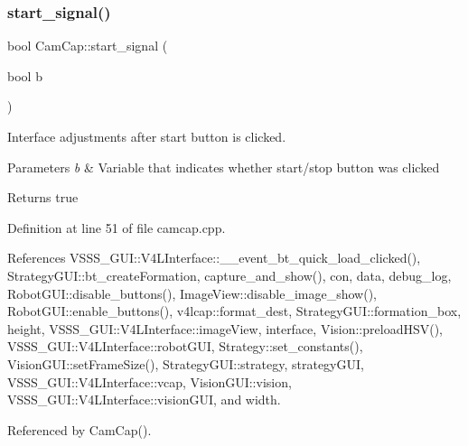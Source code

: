 \subsubsection{\texorpdfstring{start\+\_\+signal()}{start\_signal()}}
{\footnotesize\ttfamily bool Cam\+Cap\+::start\+\_\+signal (\begin{DoxyParamCaption}\item[{bool}]{b }\end{DoxyParamCaption})}



Interface adjustments after \textquotesingle{}start\textquotesingle{} button is clicked. 


\begin{DoxyParams}{Parameters}
{\em b} & Variable that indicates whether start/stop button was clicked \\
\hline
\end{DoxyParams}
\begin{DoxyReturn}{Returns}
true 
\end{DoxyReturn}


Definition at line 51 of file camcap.\+cpp.



References V\+S\+S\+S\+\_\+\+G\+U\+I\+::\+V4\+L\+Interface\+::\+\_\+\+\_\+event\+\_\+bt\+\_\+quick\+\_\+load\+\_\+clicked(), Strategy\+G\+U\+I\+::bt\+\_\+create\+Formation, capture\+\_\+and\+\_\+show(), con, data, debug\+\_\+log, Robot\+G\+U\+I\+::disable\+\_\+buttons(), Image\+View\+::disable\+\_\+image\+\_\+show(), Robot\+G\+U\+I\+::enable\+\_\+buttons(), v4lcap\+::format\+\_\+dest, Strategy\+G\+U\+I\+::formation\+\_\+box, height, V\+S\+S\+S\+\_\+\+G\+U\+I\+::\+V4\+L\+Interface\+::image\+View, interface, Vision\+::preload\+H\+S\+V(), V\+S\+S\+S\+\_\+\+G\+U\+I\+::\+V4\+L\+Interface\+::robot\+G\+UI, Strategy\+::set\+\_\+constants(), Vision\+G\+U\+I\+::set\+Frame\+Size(), Strategy\+G\+U\+I\+::strategy, strategy\+G\+UI, V\+S\+S\+S\+\_\+\+G\+U\+I\+::\+V4\+L\+Interface\+::vcap, Vision\+G\+U\+I\+::vision, V\+S\+S\+S\+\_\+\+G\+U\+I\+::\+V4\+L\+Interface\+::vision\+G\+UI, and width.



Referenced by Cam\+Cap().


